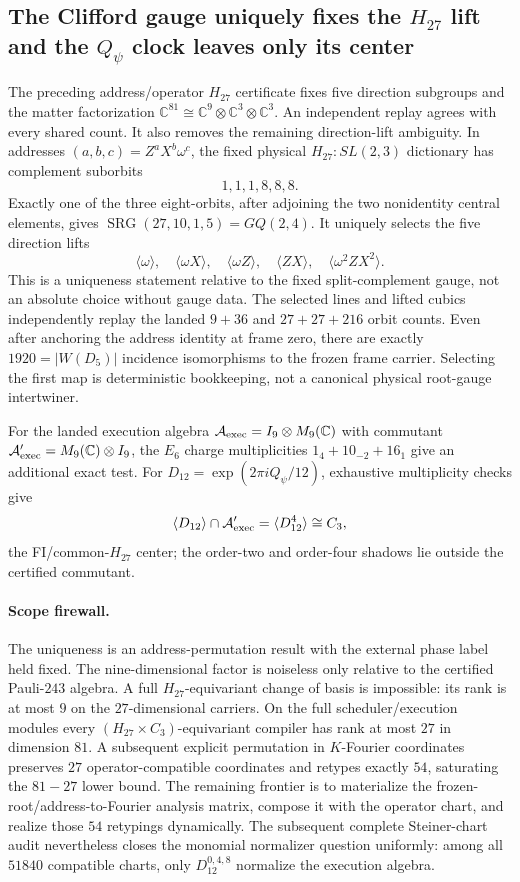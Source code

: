 \subsection*{The Clifford gauge uniquely fixes the $H_{27}$ lift and the $Q_\psi$ clock leaves only its center}

The preceding address/operator $H_{27}$ certificate fixes five direction
subgroups and the matter factorization
$\mathbb C^{81}\cong\mathbb C^9\otimes\mathbb C^3\otimes\mathbb C^3$.
An independent replay agrees with every shared count.  It also removes the
remaining direction-lift ambiguity.  In addresses
$(a,b,c)=Z^aX^b\omega^c$, the fixed physical
$H_{27}:SL(2,3)$ dictionary has complement suborbits
\[
1,1,1,8,8,8.
\]
Exactly one of the three eight-orbits, after adjoining the two nonidentity
central elements, gives $\operatorname{SRG}(27,10,1,5)=GQ(2,4)$.  It uniquely
selects the five direction lifts
\[
\langle\omega\rangle,\quad
\langle\omega X\rangle,\quad
\langle\omega Z\rangle,\quad
\langle ZX\rangle,\quad
\langle\omega^2ZX^2\rangle.
\]
This is a uniqueness statement relative to the fixed split-complement gauge,
not an absolute choice without gauge data.  The selected lines and lifted
cubics independently replay the landed $9+36$ and $27+27+216$ orbit counts.
Even after anchoring the address identity at frame zero, there are exactly
$1920=|W(D_5)|$ incidence isomorphisms to the frozen frame carrier.  Selecting
the first map is deterministic bookkeeping, not a canonical physical
root-gauge intertwiner.

For the landed execution algebra
$\mathcal A_{\rm exec}=I_9\otimes M_9(\mathbb C)$ with commutant
$\mathcal A_{\rm exec}'=M_9(\mathbb C)\otimes I_9$, the $E_6$ charge
multiplicities $1_{4}+10_{-2}+16_{1}$ give an additional exact test.
For $D_{12}=\exp(2\pi iQ_\psi/12)$, exhaustive multiplicity checks give
\[
\langle D_{12}\rangle\cap\mathcal A_{\rm exec}'
=\langle D_{12}^{4}\rangle\cong C_3,
\]
the FI/common-$H_{27}$ center; the order-two and order-four shadows lie outside
the certified commutant.

\paragraph{Scope firewall.}
The uniqueness is an address-permutation result with the external phase label
held fixed.  The nine-dimensional factor is noiseless only relative to the
certified Pauli-$243$ algebra.  A full $H_{27}$-equivariant change of basis is
impossible: its rank is at most $9$ on the $27$-dimensional carriers.  On the
full scheduler/execution modules every
$(H_{27}\times C_3)$-equivariant compiler has rank at most $27$ in dimension
$81$.  A subsequent explicit permutation in $K$-Fourier coordinates preserves
$27$ operator-compatible coordinates and retypes exactly $54$, saturating the
$81-27$ lower bound.  The remaining frontier is to materialize the
frozen-root/address-to-Fourier analysis matrix, compose it with the operator
chart, and realize those $54$ retypings dynamically.
The subsequent complete Steiner-chart audit nevertheless closes the monomial
normalizer question uniformly: among all $51840$ compatible charts, only
$D_{12}^{0,4,8}$ normalize the execution algebra.
